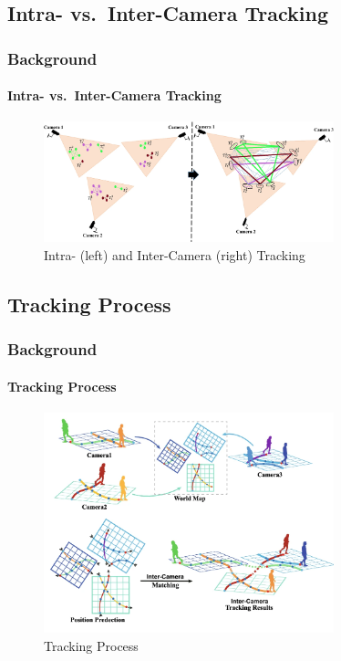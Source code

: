 \subsection{Intra- vs.~Inter-Camera Tracking}
\begin{frame}
	\frametitle{Background}
	\framesubtitle{Intra- vs.~Inter-Camera Tracking}

	\begin{figure}[ht]
		\centering
		\includegraphics[width=0.75\textwidth]{resources/fig/Tesfaye19-intra_inter_camera_tracking.png}
		\caption[Intra- and Inter-Camera Tracking]{Intra- (left) and Inter-Camera (right) Tracking~\cite[Fig.~1]{Tesfaye19}}\label{fig:intra_inter_camera_tracking}
	\end{figure}
\end{frame}

\subsection{Tracking Process}
\begin{frame}
	\frametitle{Background}
	\framesubtitle{Tracking Process}

	\begin{figure}[ht]
		\centering
		\includegraphics[width=0.75\textwidth]{resources/fig/Ma21-tracking_process.png}
		\caption[Tracking Process]{Tracking Process~\cite[Fig.~1]{Ma21}}\label{fig:projection}
	\end{figure}
\end{frame}


